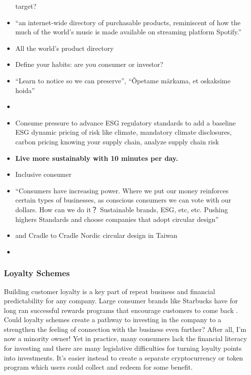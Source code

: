 \documentclass[
  letterpaper,
  DIV=11,
  numbers=noendperiod]{scrartcl}
\begin{document}
\begin{itemize}
  target?
\item
  \citet{konradA16zCryptoLeads} ``an internet-wide directory of
  purchasable products, reminiscent of how the much of the world's music
  is made available on streaming platform Spotify.''
\item
  All the world's product directory
\item
  \citet{austinryderHowBecomeInvestor2020} Define your habits: are you
  consumer or investor?
\item
  ``Learn to notice so we can preserve'', ``Õpetame märkama, et
  oskaksime hoida''
\item
  \citet{franklintempletondistributorsincConsumerCloutDriving2021}
\item
  Consume pressure to advance ESG regulatory standards to add a baseline
  ESG dynamic pricing of risk like climate, mandatory climate
  disclosures, carbon pricing knowing your supply chain, analyze supply
  chain risk
\item
  \textbf{Live more sustainably with 10 minutes per day.}
\item
  \citet{mckinseyRiseInclusiveConsumer2022} Inclusive consumer
\item
  ``Consumers have increasing power. Where we put our money reinforces
  certain types of businesses, as conscious consumers we can vote with
  our dollars. How can we do it？ Sustainable brands, ESG, etc, etc.
  Pushing highers Standards and choose companies that adopt circular
  design''
\item
  \citet{TaiWanSheJiYanJiuYuanTDRIInstagram2021} and
  \citet{HuoDongTongBeiOuXunHuanSheJiLunTanNordicCircular} Cradle to
  Cradle Nordic circular design in Taiwan
\item
  \citet{mckinseyESGEssentialCompanies2022}
\end{itemize}

\subsubsection{Loyalty Schemes}\label{loyalty-schemes}

Building customer loyalty is a key part of repeat business and financial
predictability for any company. Large consumer brands like Starbucks
have for long ran successful rewards programs that encourage customers
to come back \citep{steinhoffLoyaltyProgramsTravel2021}. Could loyalty
schemes create a pathway to investing in the company to a strengthen the
feeling of connection with the business even further? After all, I'm now
a minority owner! Yet in practice, many consumers lack the financial
literacy for investing and there are many legislative difficulties for
turning loyalty points into investments. It's easier instead to create a
separate cryptocurrency or token program which users could collect and
redeem for some benefit.
\end{document}
